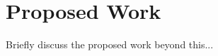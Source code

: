 \begin{comment}

\vskip 0.5em

In summary, this thesis makes the following contributions:

\begin{enumerate}


\item We implement a fully-functioning SDN controller which allows a
network's administrators to safely delegate their authority using our API.

\item We analyze a previously proposed algorithm for consolidating
hierarchical policies, and propose a new algorithm that reduces the complexity
from exponential to polynomial.

\item We demonstrate our system's usefulness and
practicality on a real OpenFlow testbed using 
microbenchmarks and four real applications enhanced with our API.


\end{enumerate}

\end{comment}

\section{Proposed Work}

{\color{red}
Briefly discuss the proposed work beyond this...
}